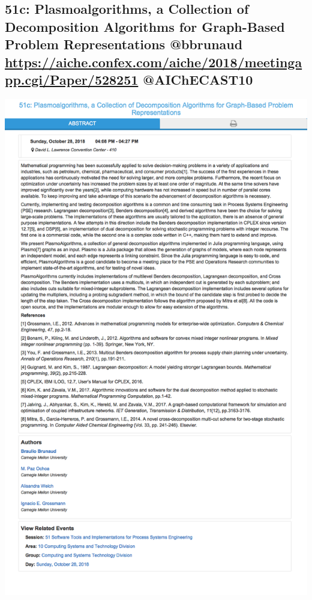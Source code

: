 \documentclass[11pt]{article}
\begin{document}
\subsection{51c: Plasmoalgorithms, a Collection of Decomposition Algorithms for Graph-Based Problem Representations  @bbrunaud \url{https://aiche.confex.com/aiche/2018/meetingapp.cgi/Paper/528251} @AIChECAST10}
\label{sec:org6a825e2}
\begin{center}
\includegraphics[width=.9\linewidth]{./528251.png}
\end{center}
\end{document}
